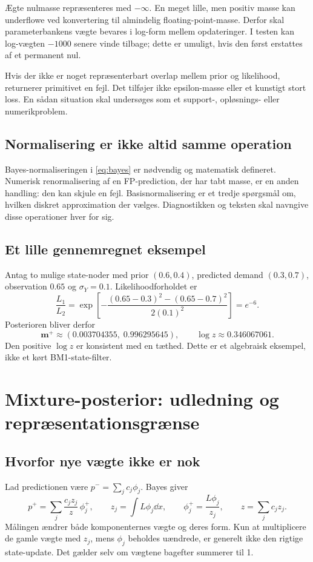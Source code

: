 Ægte nulmasse repræsenteres med \(-\infty\). En meget lille, men positiv masse kan underflowe ved konvertering til almindelig floating-point-masse. Derfor skal parameterbankens vægte bevares i log-form mellem opdateringer. I testen kan log-vægten \(-1000\) senere vinde tilbage; dette er umuligt, hvis den først erstattes af et permanent nul.

Hvis der ikke er noget repræsenterbart overlap mellem prior og likelihood, returnerer primitivet en fejl. Det tilføjer ikke epsilon-masse eller et kunstigt stort loss. En sådan situation skal undersøges som et support-, opløsnings- eller numerikproblem.

\subsection{Normalisering er ikke altid samme operation}
Bayes-normaliseringen i \eqref{eq:bayes} er nødvendig og matematisk defineret. Numerisk renormalisering af en FP-prediction, der har tabt masse, er en anden handling: den kan skjule en fejl. Basisnormalisering er et tredje spørgsmål om, hvilken diskret approximation der vælges. Diagnostikken og teksten skal navngive disse operationer hver for sig.

\subsection{Et lille gennemregnet eksempel}
Antag to mulige state-noder med prior \((0.6,0.4)\), predicted demand \((0.3,0.7)\), observation \(0.65\) og \(\sigma_Y=0.1\). Likelihoodforholdet er
\[
 \frac{L_1}{L_2}=\exp\!\left[-\frac{(0.65-0.3)^2-(0.65-0.7)^2}{2(0.1)^2}\right]=e^{-6}.
\]
Posterioren bliver derfor
\begin{equation}
 \bm m^+\approx(0.003704355,\;0.996295645),\qquad \log z\approx0.346067061.
 \label{eq:toybayes}
\end{equation}
Den positive \(\log z\) er konsistent med en tæthed. Dette er et algebraisk eksempel, ikke et kørt BM1-state-filter.

\section{Mixture-posterior: udledning og repræsentationsgrænse}
\subsection{Hvorfor nye vægte ikke er nok}
Lad predictionen være \(p^-=\sum_jc_j\phi_j\). Bayes giver
\begin{equation}
 p^+=\sum_j\frac{c_jz_j}{z}\,\phi_j^+,
 \qquad z_j=\int L\phi_j\dd x,\qquad
 \phi_j^+=\frac{L\phi_j}{z_j},\qquad z=\sum_jc_jz_j.
 \label{eq:mixturebayes}
\end{equation}
Målingen ændrer både komponenternes vægte og deres form. Kun at multiplicere de gamle vægte med \(z_j\), mens \(\phi_j\) beholdes uændrede, er generelt ikke den rigtige state-update. Det gælder selv om vægtene bagefter summerer til 1.

